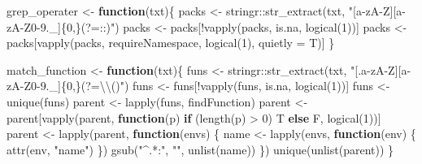 \documentclass[
]{article}
\newenvironment{Shaded}{\begin{snugshade}}{\end{snugshade}}
\newcommand{\AttributeTok}[1]{\textcolor[rgb]{0.77,0.63,0.00}{#1}}
\newcommand{\ControlFlowTok}[1]{\textcolor[rgb]{0.13,0.29,0.53}{\textbf{#1}}}
\newcommand{\DecValTok}[1]{\textcolor[rgb]{0.00,0.00,0.81}{#1}}
\newcommand{\FunctionTok}[1]{\textcolor[rgb]{0.00,0.00,0.00}{#1}}
\newcommand{\NormalTok}[1]{#1}
\newcommand{\OtherTok}[1]{\textcolor[rgb]{0.56,0.35,0.01}{#1}}
\newcommand{\SpecialCharTok}[1]{\textcolor[rgb]{0.00,0.00,0.00}{#1}}
\newcommand{\StringTok}[1]{\textcolor[rgb]{0.31,0.60,0.02}{#1}}
\begin{document}
\begin{Shaded}
\begin{Highlighting}[]
\NormalTok{grep\_operater }\OtherTok{\textless{}{-}} \ControlFlowTok{function}\NormalTok{(txt)\{}
\NormalTok{  packs }\OtherTok{\textless{}{-}}\NormalTok{ stringr}\SpecialCharTok{::}\FunctionTok{str\_extract}\NormalTok{(txt, }\StringTok{"[a{-}zA{-}Z][a{-}zA{-}Z0{-}9.\_]\{0,\}(?=::)"}\NormalTok{)}
\NormalTok{  packs }\OtherTok{\textless{}{-}}\NormalTok{ packs[}\SpecialCharTok{!}\FunctionTok{vapply}\NormalTok{(packs, is.na, }\FunctionTok{logical}\NormalTok{(}\DecValTok{1}\NormalTok{))]}
\NormalTok{  packs }\OtherTok{\textless{}{-}}\NormalTok{ packs[}\FunctionTok{vapply}\NormalTok{(packs, requireNamespace, }\FunctionTok{logical}\NormalTok{(}\DecValTok{1}\NormalTok{), }\AttributeTok{quietly =}\NormalTok{ T)]}
\NormalTok{\}}

\NormalTok{match\_function }\OtherTok{\textless{}{-}} \ControlFlowTok{function}\NormalTok{(txt)\{}
\NormalTok{  funs }\OtherTok{\textless{}{-}}\NormalTok{ stringr}\SpecialCharTok{::}\FunctionTok{str\_extract}\NormalTok{(txt, }\StringTok{"[.a{-}zA{-}Z][a{-}zA{-}Z0{-}9.\_]\{0,\}(?=}\SpecialCharTok{\textbackslash{}\textbackslash{}}\StringTok{()"}\NormalTok{)}
\NormalTok{  funs }\OtherTok{\textless{}{-}}\NormalTok{ funs[}\SpecialCharTok{!}\FunctionTok{vapply}\NormalTok{(funs, is.na, }\FunctionTok{logical}\NormalTok{(}\DecValTok{1}\NormalTok{))]}
\NormalTok{  funs }\OtherTok{\textless{}{-}} \FunctionTok{unique}\NormalTok{(funs)}
\NormalTok{  parent }\OtherTok{\textless{}{-}} \FunctionTok{lapply}\NormalTok{(funs, findFunction)}
\NormalTok{  parent }\OtherTok{\textless{}{-}}\NormalTok{ parent[}\FunctionTok{vapply}\NormalTok{(parent, }\ControlFlowTok{function}\NormalTok{(p) }\ControlFlowTok{if}\NormalTok{ (}\FunctionTok{length}\NormalTok{(p) }\SpecialCharTok{\textgreater{}} \DecValTok{0}\NormalTok{) T }\ControlFlowTok{else}\NormalTok{ F, }\FunctionTok{logical}\NormalTok{(}\DecValTok{1}\NormalTok{))]}
\NormalTok{  parent }\OtherTok{\textless{}{-}} \FunctionTok{lapply}\NormalTok{(parent, }\ControlFlowTok{function}\NormalTok{(envs) \{}
\NormalTok{    name }\OtherTok{\textless{}{-}} \FunctionTok{lapply}\NormalTok{(envs,}
      \ControlFlowTok{function}\NormalTok{(env) \{}
        \FunctionTok{attr}\NormalTok{(env, }\StringTok{"name"}\NormalTok{)}
\NormalTok{      \})}
    \FunctionTok{gsub}\NormalTok{(}\StringTok{"\^{}.*:"}\NormalTok{, }\StringTok{""}\NormalTok{, }\FunctionTok{unlist}\NormalTok{(name))}
\NormalTok{    \})}
  \FunctionTok{unique}\NormalTok{(}\FunctionTok{unlist}\NormalTok{(parent))}
\NormalTok{\}}


\end{Highlighting}
\end{Shaded}
\end{document}
